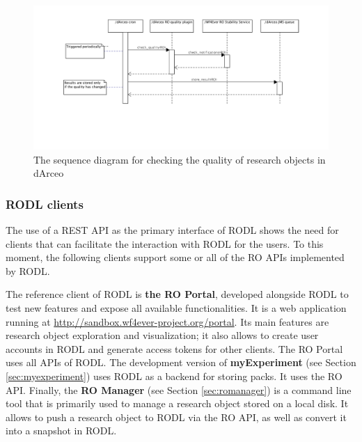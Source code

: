 \begin{figure}[!hb]
\centering
\includegraphics[width=\textwidth]{Figures/RODL/dArceoQuality.png}
\caption{The sequence diagram for checking the quality of research objects in dArceo}
\label{dArceoQuality}
\end{figure}

\subsubsection{RODL clients}

The use of a REST API as the primary interface of RODL shows the need for clients that can facilitate the interaction with RODL for the users. To this moment, the following clients support some or all of the RO APIs implemented by RODL.

The reference client of RODL is \textbf{the RO Portal}, developed alongside RODL to test new features and expose all available functionalities. It is a web application running at \url{http://sandbox.wf4ever-project.org/portal}. Its main features are research object exploration and visualization; it also allows to create user accounts in RODL and generate access tokens for other clients. The RO Portal uses all APIs of RODL. %
The development version of \textbf{myExperiment} (see Section \ref{sec:myexperiment})%
uses RODL as a backend for storing packs. It uses the RO API. Finally, the \textbf{RO Manager} (see Section \ref{sec:romanager}) %
is a command line tool that is primarily used to manage a research object stored on a local disk. It allows to push a research object to RODL via the RO API, as well as convert it into a snapshot in RODL.

